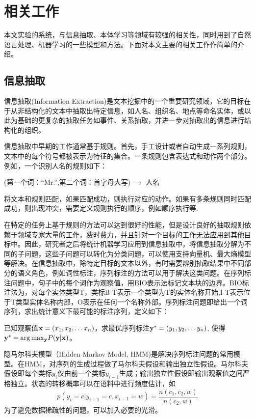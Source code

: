 \chapter{相关工作}
本文实验的系统，与信息抽取、本体学习等领域有较强的相关性，同时用到了自然语言处理、机器学习的一些模型和方法。下面对本文主要的相关工作作简单的介绍。
\section{信息抽取}

信息抽取(Information Extraction)是文本挖掘中的一个重要研究领域，它的目标在于从非结构化的文本中抽取出特定信息，如人名、组织名、地点等命名实体，或以此为基础的更复杂的抽取任务如事件、关系抽取，并进一步对抽取出的信息进行结构化的组织。

信息抽取中早期的工作通常基于规则\cite{ciravegna2001adaptive}。首先，手工设计或者自动生成一系列规则，文本中的每个符号都被表示为特征的集合。一条规则包含表达式和动作两个部分。例如，一个识别人名的规则如下：
\begin{center}
	(第一个词：``Mr.'',第二个词：首字母大写) $\rightarrow$ 人名
\end{center}
将文本和规则匹配，如果匹配成功，则执行对应的动作。如果有多条规则同时匹配成功，则出现冲突，需要定义规则执行的顺序，例如顺序执行等.

在特定的任务上基于规则的方法可以达到很好的性能，但是设计良好的抽取规则依赖于领域专家大量的工作，费时费力，并且针对一个目标的工作无法应用到其他目标中。因此，研究者之后将统计机器学习应用到信息抽取中，将信息抽取分解为不同的子问题，这些子问题可以转化为分类问题，可以使用支持向量机、最大熵模型等解决。在信息抽取中，除特定目标的文本以外，有时需要辨别抽取结果中不同部分的语义角色，例如词性标注，序列标注的方法可以用于解决这类问题。在序列标注问题中，句子中的每个词作为观察值，用BIO表示法标记文本块的边界。BIO标注法为，对每个实体类型T，类标B-T表示一个类型为T的实体名称开始,I-T表示位于T类型实体名称内部，O表示在任何一个名称外部。序列标注问题即给出一个词序列，求出统计意义下最可能的标注序列，定义如下：

\begin{problem}[序列标注]
已知观察值${\bf{x}} = ({x_1},{x_2}, \ldots {x_n})$，求最优序列标注${\bf{y^*}} = ({y_1},{y_2}, \ldots {y_n})$, 使得${{\bf{y}}^*} = \arg {\max _{\bf{y}}}P({\bf{y}}|{\bf{x}})$。
\end{problem}

隐马尔科夫模型（Hidden Markov Model, HMM)是解决序列标注问题的常用模型。在HMM，对序列的生成过程做了马尔科夫假设和输出独立性假设。马尔科夫假设即每个类标$y_i$仅由前一个类标$y_{i-1}$生成；输出独立性假设即输出观察值之间严格独立。状态的转移概率可以在语料中进行频度估计，如
\[
p(y_i=c|y_{i-1} = c, x_{i-1}=w) = \frac{n(c_1, c_2, w)}{n(c_2, w)}
\]
为了避免数据稀疏性的问题，可以加入必要的光滑。

